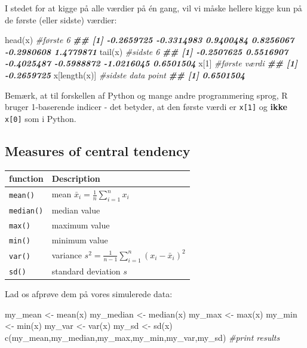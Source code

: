 \documentclass[
]{book}
\newenvironment{Shaded}{\begin{snugshade}}{\end{snugshade}}
\newcommand{\CommentTok}[1]{\textcolor[rgb]{0.56,0.35,0.01}{\textit{#1}}}
\newcommand{\DecValTok}[1]{\textcolor[rgb]{0.00,0.00,0.81}{#1}}
\newcommand{\DocumentationTok}[1]{\textcolor[rgb]{0.56,0.35,0.01}{\textbf{\textit{#1}}}}
\newcommand{\FunctionTok}[1]{\textcolor[rgb]{0.00,0.00,0.00}{#1}}
\newcommand{\NormalTok}[1]{#1}
\newcommand{\OtherTok}[1]{\textcolor[rgb]{0.56,0.35,0.01}{#1}}
\begin{document}
I stedet for at kigge på alle værdier på én gang, vil vi måske hellere kigge kun på de første (eller sidste) værdier:

\begin{Shaded}
\begin{Highlighting}[]
\FunctionTok{head}\NormalTok{(x) }\CommentTok{\#første 6}
\DocumentationTok{\#\# [1] {-}0.2659725 {-}0.3314983  0.9400484  0.8256067 {-}0.2980608  1.4779871}
\FunctionTok{tail}\NormalTok{(x) }\CommentTok{\#sidste 6}
\DocumentationTok{\#\# [1] {-}0.2507625  0.5516907 {-}0.4025487 {-}0.5988872 {-}1.0216045  0.6501504}
\NormalTok{x[}\DecValTok{1}\NormalTok{] }\CommentTok{\#første værdi}
\DocumentationTok{\#\# [1] {-}0.2659725}
\NormalTok{x[}\FunctionTok{length}\NormalTok{(x)] }\CommentTok{\#sidste data point}
\DocumentationTok{\#\# [1] 0.6501504}
\end{Highlighting}
\end{Shaded}

Bemærk, at til forskellen af Python og mange andre programmering sprog, R bruger 1-baserende indicer - det betyder, at den første værdi er \texttt{x{[}1{]}} og \textbf{ikke} \texttt{x{[}0{]}} som i Python.

\hypertarget{measures-of-central-tendency}{%
\subsection{Measures of central tendency}\label{measures-of-central-tendency}}

\begin{longtable}[]{@{}ll@{}}
\toprule
function & Description \\
\midrule
\endhead
\texttt{mean()} & mean \(\bar{x}_{i} = \frac{1}{n}\sum_{i=1}^{n} x_{i}\) \\
\texttt{median()} & median value \\
\texttt{max()} & maximum value \\
\texttt{min()} & minimum value \\
\texttt{var()} & variance \(s^2 = \frac{1}{n-1}\sum_{i=1}^{n} (x_{i} - \bar{x}_{i})^2\) \\
\texttt{sd()} & standard deviation \(s\) \\
\bottomrule
\end{longtable}

Lad os afprøve dem på vores simulerede data:

\begin{Shaded}
\begin{Highlighting}[]
\NormalTok{my\_mean }\OtherTok{\textless{}{-}} \FunctionTok{mean}\NormalTok{(x)}
\NormalTok{my\_median }\OtherTok{\textless{}{-}} \FunctionTok{median}\NormalTok{(x)}
\NormalTok{my\_max }\OtherTok{\textless{}{-}} \FunctionTok{max}\NormalTok{(x)}
\NormalTok{my\_min }\OtherTok{\textless{}{-}} \FunctionTok{min}\NormalTok{(x)}
\NormalTok{my\_var }\OtherTok{\textless{}{-}} \FunctionTok{var}\NormalTok{(x)}
\NormalTok{my\_sd }\OtherTok{\textless{}{-}} \FunctionTok{sd}\NormalTok{(x)}
\FunctionTok{c}\NormalTok{(my\_mean,my\_median,my\_max,my\_min,my\_var,my\_sd) }\CommentTok{\#print results}
\end{Highlighting}
\end{Shaded}
\end{document}
